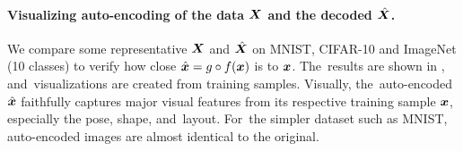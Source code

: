 \documentclass[../../book-main.tex]{subfiles}
\begin{document}
\paragraph{Visualizing auto-encoding of the data $\bm{X}$ and the decoded $\hat {\bm{X}}$.} We compare some representative $\bm{X}$ and $\hat{\bm{X}}$ on MNIST, CIFAR-10 and ImageNet (10 classes) to verify how close $\hat {\bm{x}} = g\circ f(\bm{x})$ is to $\bm{x}$. The~results are shown in , and~visualizations are created from training samples. Visually, the~auto-encoded $\hat {\bm{x}}$ faithfully captures major visual features from its respective training sample $\bm{x}$, especially the pose, shape, and~layout. For~the simpler dataset such as MNIST, auto-encoded images are almost identical to the original. %

\end{document}
